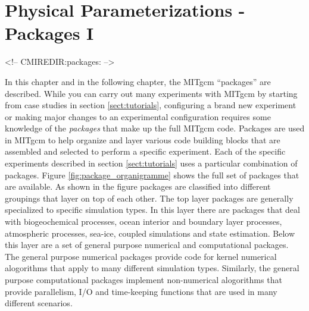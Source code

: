 
\chapter{Physical Parameterizations - Packages I}
\label{chap:packagesI}

\begin{rawhtml}
<!-- CMIREDIR:packages: -->
\end{rawhtml}

In this chapter and in the following chapter, the MITgcm ``packages'' are 
described. While you can carry out many experiments with MITgcm by starting 
from case studies in section \ref{sect:tutorials}, configuring
a brand new experiment or making major changes to an experimental configuration
requires some knowledge of the {\it packages}
that make up the full MITgcm code. Packages are used in MITgcm to
help organize and layer various code building blocks that are assembled 
and selected to perform a specific experiment. Each of the specific experiments
described in section \ref{sect:tutorials} uses a particular combination
of packages.
Figure \ref{fig:package_organigramme} shows the full set of packages that
are available. As shown in the figure packages are classified into different 
groupings that layer on top of each other. The top layer packages are 
generally specialized to specific simulation types. In this layer there are
packages that deal with biogeochemical processes, ocean interior
and boundary layer processes, atmospheric processes, sea-ice, coupled 
simulations and state estimation.
Below this layer are a set of general purpose
numerical and computational packages. The general purpose numerical packages
provide code for kernel numerical alogorithms
that apply to
many different simulation types. Similarly, the general purpose computational 
packages implement non-numerical alogorithms that provide parallelism,
I/O and time-keeping functions that are used in many different scenarios.


